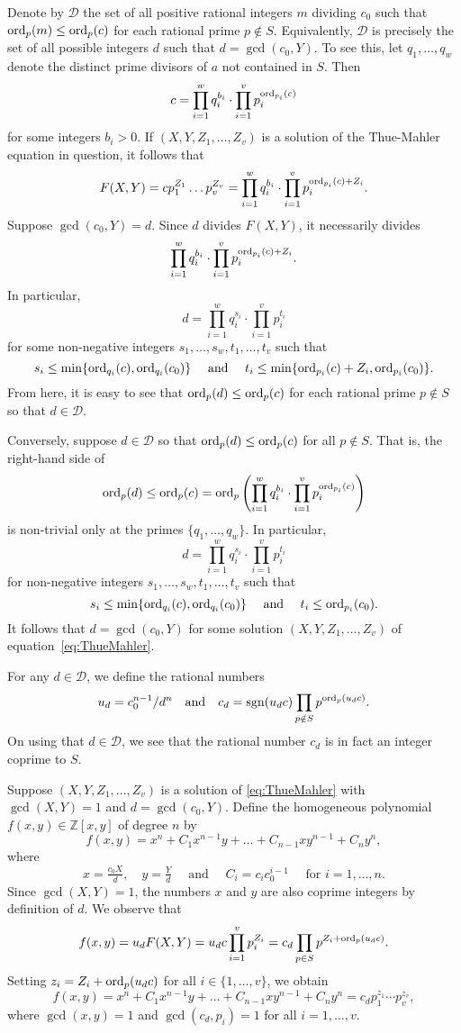 Denote by $\mathcal{D}$ the set of all positive rational integers $m$ dividing $c_0$ such that ${\operatorname{ord}_p(m)\leq \operatorname{ord}_p(c)}$ for each rational prime $p\notin S$. Equivalently, $\mathcal{D}$ is precisely the set of all possible integers $d$ such that $d = \gcd(c_0,Y)$. To see this, let $q_1, \dots, q_{w}$ denote the distinct prime divisors of $a$ not contained in $S$. Then 
\[c = \prod_{i=1}^w q_i^{b_i}\cdot \prod_{i=1}^v p_i^{\operatorname{ord}_{p_i}(c)}\]
for some integers $b_i >0$. If $(X,Y,Z_1, \dots, Z_v)$ is a solution of the Thue-Mahler equation in question, it follows that
\[F(X,Y) = cp_1^{Z_1}\dots p_v^{Z_v} =  \prod_{i=1}^w q_i^{b_i}\cdot \prod_{i=1}^v p_i^{\operatorname{ord}_{p_i}(c) + Z_i}.\]
Suppose $\gcd(c_0,Y) = d$. Since $d$ divides $F(X,Y)$, it necessarily divides 
\[{\prod_{i=1}^w q_i^{b_i}\cdot \prod_{i=1}^v p_i^{\operatorname{ord}_{p_i}(c) + Z_i}}.\] 
In particular, 
\[d = \prod_{i=1}^w q_i^{s_i}\cdot \prod_{i=1}^v p_i^{t_i}\]
for some non-negative integers $s_1, \dots, s_w, t_1, \dots, t_v$ such that 
\[s_i \leq \min\{\operatorname{ord}_{q_i}(c), \operatorname{ord}_{q_i}(c_0)\} \quad \text{ and } \quad 
	t_i \leq \min\{\operatorname{ord}_{p_i}(c) + Z_i, \operatorname{ord}_{p_i}(c_0)\}.\] 
From here, it is easy to see that ${\operatorname{ord}_p(d)\leq \operatorname{ord}_p(c)}$ for each rational prime $p\notin S$ so that $d \in \mathcal{D}$. 

Conversely, suppose $d \in \mathcal{D}$ so that $\operatorname{ord}_{p}(d) \leq \operatorname{ord}_{p}(c)$ for all $p \notin S$. That is, the right-hand side of 
\[\operatorname{ord}_{p}(d) \leq \operatorname{ord}_{p}(c) = 
\operatorname{ord}_p\left(\prod_{i=1}^w q_i^{b_i}\cdot \prod_{i=1}^v p_i^{\operatorname{ord}_{p_i}(c)}\right)\]
is non-trivial only at the primes $\{q_1, \dots, q_w\}$. In particular, 
\[d = \prod_{i=1}^w q_i^{s_i}\cdot \prod_{i=1}^v p_i^{t_i}\]
for non-negative integers $s_1, \dots, s_w, t_1, \dots, t_v$ such that 
\[s_i \leq \min\{\operatorname{ord}_{q_i}(c), \operatorname{ord}_{q_i}(c_0)\} \quad \text{ and } \quad 
	t_i \leq \operatorname{ord}_{p_i}(c_0).\] 
It follows that $d = \gcd(c_0,Y)$ for some solution $(X,Y,Z_1, \dots, Z_v)$ of equation~\eqref{eq:ThueMahler}. 

For any $d\in \mathcal{D}$, we define the rational numbers 
\[u_d = c_0^{n-1}/d^n \quad \textnormal{and}\quad c_d = \operatorname{sgn}(u_dc)\prod_{p\notin S} p^{\operatorname{ord}_p(u_dc)}.\]
On using that $d\in \mathcal{D}$, we see that the rational number $c_d$ is in fact an integer coprime to $S$. 

Suppose $(X,Y,Z_1, \dots, Z_v)$ is a solution of \eqref{eq:ThueMahler} with ${\gcd(X,Y) = 1}$ and $d = \gcd(c_0,Y)$. Define the homogeneous polynomial $f(x,y) \in \mathbb{Z}[x,y]$ of degree $n$ by
\[f(x,y) = x^n + C_1 x^{n-1}y + \dots + C_{n-1}xy^{n-1} + C_ny^n,\]
where
\[x=\tfrac{c_0X}{d},\quad y=\tfrac{Y}{d} \quad \text{ and } \quad C_i = c_ic_0^{i-1} \quad \text{ for } i = 1, \dots, n.\]
Since $\gcd(X,Y) = 1$, the numbers $x$ and $y$ are also coprime integers by definition of $d$. We observe that 
\[f(x,y) = u_dF(X,Y) = u_dc \prod_{i = 1}^v p_i^{Z_i} = c_d\prod_{p \in S}p^{Z_i + \operatorname{ord}_p(u_dc)}.\]
Setting $z_i = Z_i + \operatorname{ord}_p(u_dc)$ for all $i \in \{1, \dots, v\}$, we obtain
\begin{equation} \label{eq:ThueMahler2}
f(x,y) = x^n + C_1 x^{n-1}y + \dots + C_{n-1}xy^{n-1} + C_ny^n = c_d p_1^{z_1}\cdots p_v^{z_v}, 
\end{equation}
where $\gcd(x,y) = 1$ and $\gcd(c_d,p_i) = 1$ for all $i = 1, \dots, v$. 

